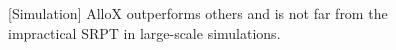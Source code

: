\begin{figure}[h]
	\centering
	\caption{[Simulation] AlloX outperforms others and is not far from the impractical SRPT in large-scale simulations.}
	\label{fig:sim_large_scale}
\end{figure}







